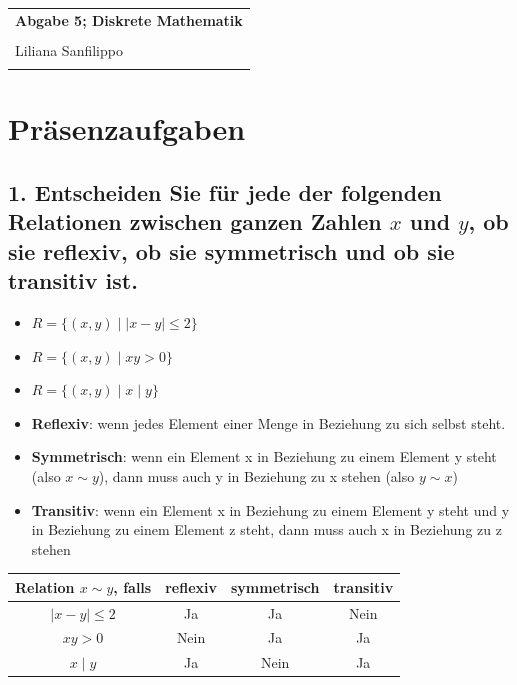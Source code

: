 \documentclass{article} %
\newcommand{\titulo}{Abgabe 5; Diskrete Mathematik}
\newcommand{\nombre}{Liliana Sanfilippo}
\begin{document}
\begin{tabular}{p{12cm}}
{{\Large\bf\titulo}}\\
\vspace{0.2cm}\\
 {\large\nombre}\\
 \vspace{0.2cm}\\   
\end{tabular}
\section*{Präsenzaufgaben}

\subsection*{1. Entscheiden Sie für jede der folgenden Relationen zwischen ganzen Zahlen \( x \) und \( y \), ob sie reflexiv, ob sie symmetrisch und ob sie transitiv ist.}
\begin{itemize}
    \item[(a)] \( R = \{(x, y) \mid |x - y| \leq 2 \} \)
    \item[(b)] \( R = \{(x, y) \mid xy > 0 \} \)
    \item[(c)] \( R = \{(x, y) \mid x \mid y \} \)
\end{itemize} 
\color{Blue}
\begin{itemize}
    \item \textbf{Reflexiv}: wenn jedes Element einer Menge in Beziehung zu sich selbst steht. 
    \item \textbf{Symmetrisch}: wenn ein Element x in Beziehung zu einem Element y steht (also $x \sim y$), dann muss auch y in Beziehung zu x stehen (also $y \sim x$)
    \item \textbf{Transitiv}: wenn ein Element x in Beziehung zu einem Element y steht und y in Beziehung zu einem Element z steht, dann muss auch x in Beziehung zu z stehen
\end{itemize}
\color{black}
\begin{mybox}
    \begin{tabular}{c|ccc}
        Relation $x \sim y$, falls  & reflexiv & symmetrisch & transitiv \\ \hline
        $|x - y| \leq 2$ &  Ja & Ja & Nein \\ 
        $xy > 0$ & Nein & Ja & Ja \\
        $x \mid y$ & Ja & Nein & Ja \\
    \end{tabular}
\end{mybox}
\end{document}
